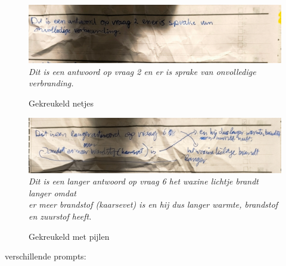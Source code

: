 \documentclass[12pt]{article}
\begin{document}
\begin{multicols}{2}
\begin{figure}[H]
    \label{fig:enter-label}
\end{figure}
\begin{figure}[H]
    \centering
    \includegraphics[width=1\linewidth]{./images/methoden/inscannen/tekst/gekreukeld_netjes.png}
    \textit{Dit is een antwoord op vraag 2 en er is sprake van onvolledige verbranding.}
    \caption{Gekreukeld netjes}
    \label{fig:enter-label}
\end{figure}
\begin{figure}[H]
    \centering
    \includegraphics[width=1\linewidth]{./images/methoden/inscannen/tekst/gekreukeld_met_pijlen.png}
    \textit{Dit is een langer antwoord op vraag 6 het waxine lichtje brandt langer omdat \\
er meer brandstof (kaarsevet) is en hij dus langer warmte, brandstof en zuurstof heeft.}
    \caption{Gekreukeld met pijlen}
    \label{fig:enter-label}
\end{figure}


\end{multicols}
\pagebreak
{} verschillende prompts:\\
\end{document}
